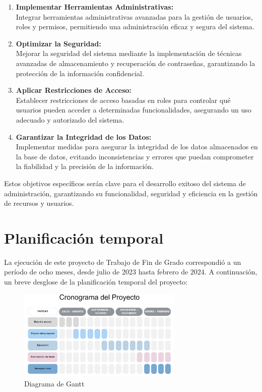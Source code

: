 \documentclass[a4paper, 12pt]{book}
\begin{document}
\begin{enumerate}
  \item \textbf{Implementar Herramientas Administrativas:} \\Integrar herramientas administrativas avanzadas para la gestión de usuarios, roles y permisos, permitiendo una administración eficaz y segura del sistema.
  \item \textbf{Optimizar la Seguridad:} \\Mejorar la seguridad del sistema mediante la implementación de técnicas avanzadas de almacenamiento y recuperación de contraseñas, garantizando la protección de la información confidencial.
  \item \textbf{Aplicar Restricciones de Acceso:} \\Establecer restricciones de acceso basadas en roles para controlar qué usuarios pueden acceder a determinadas funcionalidades, asegurando un uso adecuado y autorizado del sistema.
  \item \textbf{Garantizar la Integridad de los Datos:} \\Implementar medidas para asegurar la integridad de los datos almacenados en la base de datos, evitando inconsistencias y errores que puedan comprometer la fiabilidad y la precisión de la información.
\end{enumerate}

Estos objetivos específicos serán clave para el desarrollo exitoso del sistema de administración, garantizando su funcionalidad, seguridad y eficiencia en la gestión de recursos y usuarios.

\section{Planificación temporal}
\label{sec:planificacion-temporal}
La ejecución de este proyecto de Trabajo de Fin de Grado correspondió a un período de ocho meses, desde julio de 2023 hasta febrero de 2024. A continuación, un breve desglose de la planificación temporal del proyecto:

\begin{figure}
  \centering
  \includegraphics[width=0.7\textwidth]{img/gann.png}
  \caption{Diagrama de Gantt}
  \label{fig:arquitectura}
\end{figure}
\end{document}
